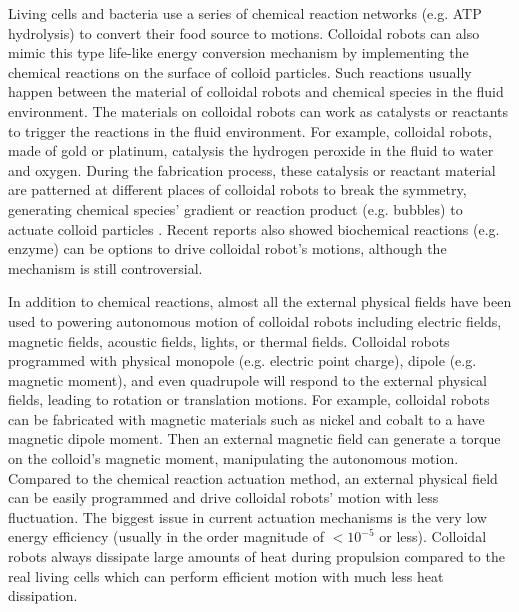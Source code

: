 Living cells and bacteria use a series of  chemical reaction networks (e.g. ATP hydrolysis) to convert their food source to motions. Colloidal robots can also mimic this type life-like energy conversion mechanism by implementing the chemical reactions on the surface of colloid particles. Such reactions usually happen between the material of colloidal robots and chemical species in the fluid environment. The materials on colloidal robots can work as catalysts or reactants to trigger the reactions in the fluid environment. For example,  colloidal robots,  made of gold or platinum, catalysis the hydrogen peroxide in the fluid to water and oxygen. During the fabrication process, these catalysis or reactant material are patterned at different places of colloidal robots to break the symmetry,  generating chemical species' gradient or reaction product (e.g. bubbles) to actuate colloid particles \autocite{velegol2016origins,shklyaev2016harnessing,parmar2018micro}. Recent reports also showed biochemical reactions (e.g. enzyme) can be options to drive colloidal robot's motions, although the mechanism is still controversial\autocite{zhao2018substrate,somasundar2019positive}.

In addition to  chemical reactions, almost all the external physical fields have been used to powering autonomous motion of colloidal robots including electric fields\autocite{lee2019directed}, magnetic fields\autocite{zhang2009artificial}, acoustic fields\autocite{sabrina2018shape}, lights\autocite{dai2016programmable}, or thermal fields\autocite{lozano2016phototaxis}.  Colloidal robots programmed with physical monopole (e.g. electric point charge), dipole (e.g. magnetic moment), and even quadrupole will respond to the external physical fields, leading to rotation or translation motions. For example, colloidal robots can be fabricated with magnetic materials such as nickel and cobalt to a have magnetic dipole moment. Then an external magnetic field can generate a torque on the colloid's magnetic moment, manipulating the autonomous motion. Compared to the  chemical reaction actuation method, an external physical field can be easily programmed and  drive colloidal robots' motion with less fluctuation\autocite{han2018engineering,ren2018two}. 
The biggest issue in current actuation mechanisms is the very low energy efficiency (usually in the order magnitude of $<10^{-5}$ or less). Colloidal robots always dissipate large amounts of heat\autocite{wang2013understanding} during propulsion compared to the real living cells which can perform efficient motion with much less heat dissipation.

